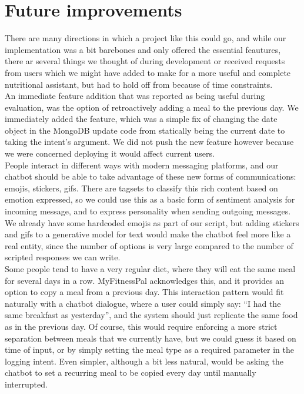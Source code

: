 \section{Future improvements} 
There are many directions in which a project like this could go, and while our implementation was a bit barebones and only offered the essential feautures, there ar several things we thought of during development or received requests from users which we might have added to make for a more useful and complete nutritional assistant, but had to hold off from because of time constraints. \\
An immediate feature addition that was reported as being useful during evaluation, was the option of retroactively adding a meal to the previous day. We immediately added the feature, which was a simple fix of changing the date object in the MongoDB update code from statically being the current date to taking the intent's argument. We did not push the new feature however because we were concerned deploying it would affect current users. \\
People interact in different ways with modern messaging platforms, and our chatbot should be able to take advantage of these new forms of communications: emojis, stickers, gifs. There are tagsets to classify this rich content based on emotion expressed, so we could use this as a basic form of sentiment analysis for incoming message, and to express personality when sending outgoing messages. We already have some hardcoded emojis as part of our script, but adding stickers and gifs to a generative model for text would make the chatbot feel more like a real entity, since the number of options is very large compared to the number of scripted responses we can write. \\
Some people tend to have a very regular diet, where they will eat the same meal for several days in a row. MyFitnessPal acknowledges this, and it provides an option to copy a meal from a previous day. This interaction pattern would fit naturally with a chatbot dialogue, where a user could simply say: ``I had the same breakfast as yesterday'', and the system should just replicate the same food as in the previous day. Of course, this would require enforcing a more strict separation between meals that we currently have, but we could guess it based on time of input, or by simply setting the meal type as a required parameter in the logging intent. Even simpler, although a bit less natural, would be asking the chatbot to set a recurring meal to be copied every day until manually interrupted. \\

